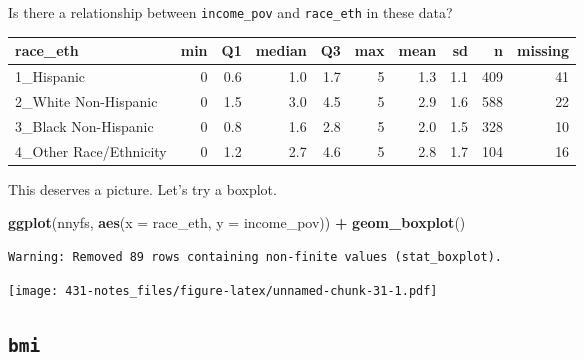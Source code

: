 \documentclass[
]{book}
\newenvironment{Shaded}{\begin{snugshade}}{\end{snugshade}}
\newcommand{\DataTypeTok}[1]{\textcolor[rgb]{0.13,0.29,0.53}{#1}}
\newcommand{\DecValTok}[1]{\textcolor[rgb]{0.00,0.00,0.81}{#1}}
\newcommand{\KeywordTok}[1]{\textcolor[rgb]{0.13,0.29,0.53}{\textbf{#1}}}
\newcommand{\NormalTok}[1]{#1}
\newcommand{\OperatorTok}[1]{\textcolor[rgb]{0.81,0.36,0.00}{\textbf{#1}}}
\newcommand{\StringTok}[1]{\textcolor[rgb]{0.31,0.60,0.02}{#1}}
\begin{document}
Is there a relationship between \texttt{income\_pov} and \texttt{race\_eth} in these data?

\begin{Shaded}
\end{Shaded}

\begin{tabular}{l|r|r|r|r|r|r|r|r|r}
\hline
race\_eth & min & Q1 & median & Q3 & max & mean & sd & n & missing\\
\hline
1\_Hispanic & 0 & 0.6 & 1.0 & 1.7 & 5 & 1.3 & 1.1 & 409 & 41\\
\hline
2\_White Non-Hispanic & 0 & 1.5 & 3.0 & 4.5 & 5 & 2.9 & 1.6 & 588 & 22\\
\hline
3\_Black Non-Hispanic & 0 & 0.8 & 1.6 & 2.8 & 5 & 2.0 & 1.5 & 328 & 10\\
\hline
4\_Other Race/Ethnicity & 0 & 1.2 & 2.7 & 4.6 & 5 & 2.8 & 1.7 & 104 & 16\\
\hline
\end{tabular}

This deserves a picture. Let's try a boxplot.

\begin{Shaded}
\begin{Highlighting}[]
\KeywordTok{ggplot}\NormalTok{(nnyfs, }\KeywordTok{aes}\NormalTok{(}\DataTypeTok{x =}\NormalTok{ race_eth, }\DataTypeTok{y =}\NormalTok{ income_pov)) }\OperatorTok{+}
\StringTok{  }\KeywordTok{geom_boxplot}\NormalTok{()}
\end{Highlighting}
\end{Shaded}

\begin{verbatim}
Warning: Removed 89 rows containing non-finite values (stat_boxplot).
\end{verbatim}

\texttt{[image: 431-notes\_files/figure-latex/unnamed-chunk-31-1.pdf]}

\hypertarget{bmi}{%
\subsection{\texorpdfstring{\texttt{bmi}}{bmi}}\label{bmi}}
\end{document}
